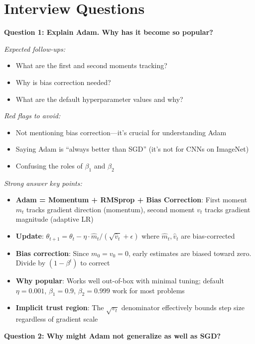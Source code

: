 \documentclass[../../main.tex]{subfiles}
\begin{document}
\section*{Interview Questions}
\begin{interviewquestions}

\textbf{Question 1: Explain Adam. Why has it become so popular?}

\textit{Expected follow-ups:}
\begin{itemize}
    \item What are the first and second moments tracking?
    \item Why is bias correction needed?
    \item What are the default hyperparameter values and why?
\end{itemize}

\textit{Red flags to avoid:}
\begin{itemize}
    \item Not mentioning bias correction---it's crucial for understanding Adam
    \item Saying Adam is ``always better than SGD'' (it's not for CNNs on ImageNet)
    \item Confusing the roles of $\beta_1$ and $\beta_2$
\end{itemize}

\textit{Strong answer key points:}
\begin{itemize}
    \item \textbf{Adam = Momentum + RMSprop + Bias Correction}: First moment $m_t$ tracks gradient direction (momentum), second moment $v_t$ tracks gradient magnitude (adaptive LR)
    \item \textbf{Update}: $\theta_{t+1} = \theta_t - \eta \cdot \hat{m}_t / (\sqrt{\hat{v}_t} + \epsilon)$ where $\hat{m}_t, \hat{v}_t$ are bias-corrected
    \item \textbf{Bias correction}: Since $m_0 = v_0 = 0$, early estimates are biased toward zero. Divide by $(1 - \beta^t)$ to correct
    \item \textbf{Why popular}: Works well out-of-box with minimal tuning; default $\eta=0.001$, $\beta_1=0.9$, $\beta_2=0.999$ work for most problems
    \item \textbf{Implicit trust region}: The $\sqrt{v_t}$ denominator effectively bounds step size regardless of gradient scale
\end{itemize}

\vspace{0.5em}
\textbf{Question 2: Why might Adam not generalize as well as SGD?}


\end{interviewquestions}
\end{document}
